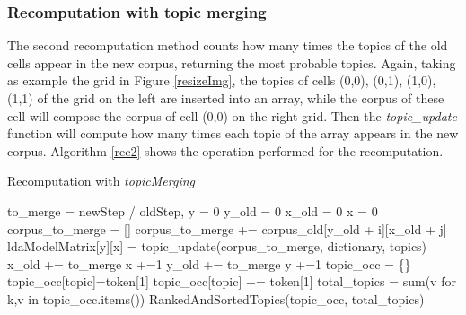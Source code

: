 \documentclass{sig-alternate-05-2015}
\begin{document}
\subsubsection{Recomputation with topic merging}
The second recomputation method counts how many times the topics of the old cells appear in the new corpus, returning the most probable topics. Again, taking as example the grid in Figure \ref{resizeImg}, the  topics of cells (0,0), (0,1), (1,0), (1,1) of the grid on the left are inserted into an array, while the corpus of these cell will compose the corpus of cell (0,0) on the right grid. Then the \textit{topic\_update} function will compute how many times each topic of the array appears in the new corpus. Algorithm \ref{rec2} shows the operation performed for the recomputation.
\begin{algorithm*}[h]
\caption{Recomputation with \textit{topicMerging}}\label{rec2}
\begin{algorithmic}[1]
	\State to\_merge = newStep / oldStep,
    \State y = 0
    \State y\_old = 0
    	\State x\_old = 0
    	\State x = 0
        \State corpus\_to\_merge = []
			\State corpus\_to\_merge += corpus\_old[y\_old + i][x\_old + j]
   				\EndFor
   			\EndFor
   				\State ldaModelMatrix[y][x] = topic\_update(corpus\_to\_merge, dictionary, topics) 
   			\State x\_old += to\_merge
   			\State x +=1
   		\EndWhile
   		\State y\_old += to\_merge
   		\State y +=1
    \EndWhile
\EndProcedure
{}
\State topic\_occ = \{\}
					\State topic\_occ[topic]=token[1]
				\Else
					\State	topic\_occ[topic] += token[1]
				\EndIf
			\EndIf
		\EndFor
	\EndFor
\EndFor
\State total\_topics = sum(v for k,v in topic\_occ.items())
\State \Return RankedAndSortedTopics(topic\_occ, total\_topics)

\EndFunction
\end{algorithmic}
\end{algorithm*}
\end{document}
